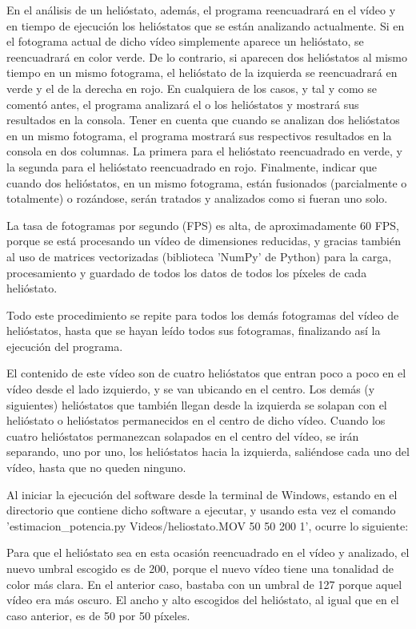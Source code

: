 En el análisis de un helióstato, además, el programa reencuadrará en el vídeo y en tiempo de ejecución los helióstatos que se están analizando actualmente. Si en el fotograma actual de dicho vídeo simplemente aparece un helióstato, se reencuadrará en color verde. De lo contrario, si aparecen dos helióstatos al mismo tiempo en un mismo fotograma, el helióstato de la izquierda se reencuadrará en verde y el de la derecha en rojo. En cualquiera de los casos, y tal y como se comentó antes, el programa analizará el o los helióstatos y mostrará sus resultados en la consola. Tener en cuenta que cuando se analizan dos helióstatos en un mismo fotograma, el programa mostrará sus respectivos resultados en la consola en dos columnas. La primera para el helióstato reencuadrado en verde, y la segunda para el helióstato reencuadrado en rojo. Finalmente, indicar que cuando dos helióstatos, en un mismo fotograma, están fusionados (parcialmente o totalmente) o rozándose, serán tratados y analizados como si fueran uno solo.

La tasa de fotogramas por segundo (FPS) es alta, de aproximadamente 60 FPS, porque se está procesando un vídeo de dimensiones reducidas, y gracias también al uso de matrices vectorizadas (biblioteca 'NumPy' de Python) para la carga, procesamiento y guardado de todos los datos de todos los píxeles de cada helióstato.

Todo este procedimiento se repite para todos los demás fotogramas del vídeo de helióstatos, hasta que se hayan leído todos sus fotogramas, finalizando así la ejecución del programa.

El contenido de este vídeo son de cuatro helióstatos que entran poco a poco en el vídeo desde el lado izquierdo, y se van ubicando en el centro. Los demás (y siguientes) helióstatos que también llegan desde la izquierda se solapan con el helióstato o helióstatos permanecidos en el centro de dicho vídeo. Cuando los cuatro helióstatos permanezcan solapados en el centro del vídeo, se irán separando, uno por uno, los helióstatos hacia la izquierda, saliéndose cada uno del vídeo, hasta que no queden ninguno.

Al iniciar la ejecución del software desde la terminal de Windows, estando en el directorio que contiene dicho software a ejecutar, y usando esta vez el comando 'estimacion\_potencia.py Videos/heliostato.MOV 50 50 200 1', ocurre lo siguiente:

Para que el helióstato sea en esta ocasión reencuadrado en el vídeo y analizado, el nuevo umbral escogido es de 200, porque el nuevo vídeo tiene una tonalidad de color más clara. En el anterior caso, bastaba con un umbral de 127 porque aquel vídeo era más oscuro. El ancho y alto escogidos del helióstato, al igual que en el caso anterior, es de 50 por 50 píxeles.

